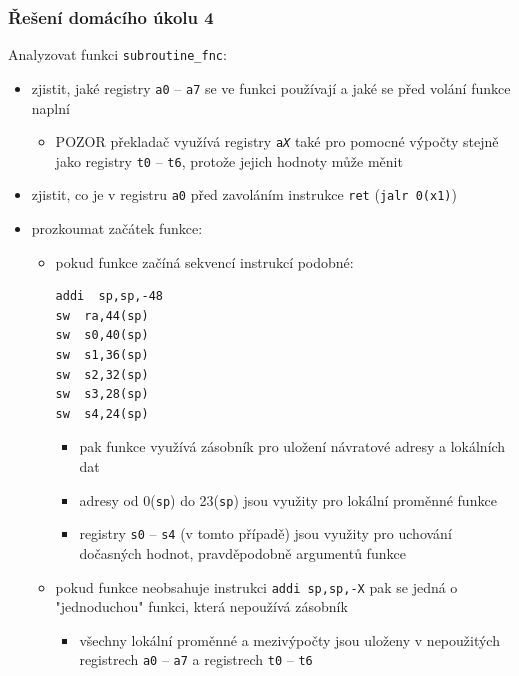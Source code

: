 \documentclass{beamer}
\begin{document}
\begin{frame}[fragile,shrink=5]
\frametitle{Řešení domácího úkolu 4}

Analyzovat funkci \texttt{subroutine\_fnc}:
\begin{itemize}
\item zjistit, jaké registry \texttt{a0} -- \texttt{a7} se ve funkci používají a jaké se před volání funkce naplní
 \begin{itemize}
 \item POZOR překladač využívá registry \texttt{a\textit{X}} také pro pomocné výpočty stejně jako registry \texttt{t0} -- \texttt{t6}, protože jejich hodnoty může měnit
 \end{itemize}
\item zjistit, co je v registru \texttt{a0} před zavoláním instrukce \texttt{ret} (\texttt{jalr 0(x1)})
\item prozkoumat začátek funkce:
 \begin{itemize}
 \item pokud funkce začíná sekvencí instrukcí podobné:
\begin{verbatim}
addi  sp,sp,-48
sw  ra,44(sp)
sw  s0,40(sp)
sw  s1,36(sp)
sw  s2,32(sp)
sw  s3,28(sp)
sw  s4,24(sp)
\end{verbatim}
\begin{itemize}
 \item pak funkce využívá zásobník pro uložení návratové adresy a lokálních dat
 \item adresy od 0(\texttt{sp}) do 23(\texttt{sp}) jsou využity pro lokální proměnné funkce
 \item registry \texttt{s0} -- \texttt{s4} (v tomto případě) jsou využity pro uchování dočasných hodnot, pravděpodobně argumentů funkce
 \end{itemize}
 \item pokud funkce neobsahuje instrukci \texttt{addi sp,sp,-X} pak se jedná o "jednoduchou" funkci, která nepoužívá zásobník
\begin{itemize}
 \item všechny lokální proměnné a mezivýpočty jsou uloženy v nepoužitých registrech \texttt{a0} -- \texttt{a7} a registrech \texttt{t0} -- \texttt{t6}
 \end{itemize}
 \end{itemize}
 \end{itemize}
\end{frame}
\end{document}
